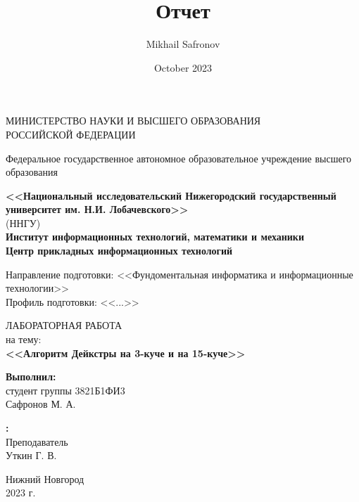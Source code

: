 \documentclass[a4paper, 12pt]{article}
\title{Отчет}
\author{Mikhail Safronov}
\date{October 2023}
\theoremstyle{definition}
\begin{document}
	
	
	\begin{titlepage}
		\begin{center}
			\large
			{МИНИСТЕРСТВО НАУКИ И ВЫСШЕГО ОБРАЗОВАНИЯ\\ РОССИЙСКОЙ ФЕДЕРАЦИИ}
			
			Федеральное государственное автономное образовательное учреждение высшего образования
			\vspace{0.5cm}
			
			\textbf{<<Национальный исследовательский Нижегородский государственный университет им. Н.И. Лобачевского>>}\\
			(ННГУ)\\
			\vspace{1cm}
			\textbf{Институт информационных технологий, математики и механики}\\
			\vspace{1cm}
			\textbf{Центр прикладных информационных технологий}
			\vspace{1cm}
			
			Направление подготовки: <<Фундоментальная информатика и информационные технологии>>\\
			Профиль подготовки: <<...>>
			\vfill
			
			
			
			\vfill
			
			\Large
			ЛАБОРАТОРНАЯ РАБОТА\\
			на тему:\\
			\textbf{<<Алгоритм Дейкстры на 3-куче и на 15-куче>>}
			{\LARGE 
			}
			\bigskip
			
			
		\end{center}
		\vfill
		
		\newlength{\ML}
		\hfill\begin{minipage}{0.4\textwidth}
			\textbf{Выполнил:}\\
			студент группы 3821Б1ФИ3\\
			Сафронов М. А.\\
		\end{minipage}%
		\bigskip
		
		\hfill\begin{minipage}{0.4\textwidth}
			\textbf{:}\\
			Преподаватель\\
			Уткин Г. В.\\
		\end{minipage}%
		\vfill
		
		\begin{center}
			Нижний Новгород\\
			2023 г.
		\end{center}
	\end{titlepage}
	
\end{document}
